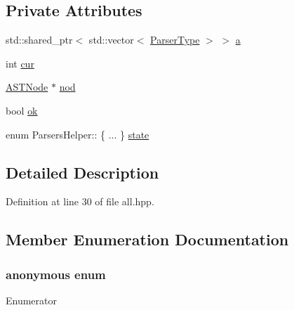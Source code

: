 \subsection*{Private Attributes}
\begin{DoxyCompactItemize}
\item 
std\+::shared\+\_\+ptr$<$ std\+::vector$<$ \hyperlink{parsers_2all_8hpp_abe36ed7c3b8a2eebe6d943c84fe72b9c}{Parser\+Type} $>$ $>$ \hyperlink{class_parsers_helper_a1c30abdf7ce5ad7d5e67237f88f18223}{a}
\item 
int \hyperlink{class_parsers_helper_a51c199f259d9aadab7d02681c9e57c49}{cur}
\item 
\hyperlink{struct_a_s_t_node}{A\+S\+T\+Node} $\ast$ \hyperlink{class_parsers_helper_a241ca292b5a231634a4486120c1d4b9f}{nod}
\item 
bool \hyperlink{class_parsers_helper_a88e598a10d698b0962efa12ee6121436}{ok}
\item 
enum Parsers\+Helper\+:: \{ ... \}  \hyperlink{class_parsers_helper_a268b5522cce719a0c28d3e48d9b5cc04}{state}
\end{DoxyCompactItemize}


\subsection{Detailed Description}


Definition at line 30 of file all.\+hpp.



\subsection{Member Enumeration Documentation}
\hypertarget{class_parsers_helper_ac5239b5c4a61b2f239f668b738f613be}{}\subsubsection[{anonymous enum}]{\setlength{\rightskip}{0pt plus 5cm}anonymous enum\hspace{0.3cm}{\ttfamily [private]}}\label{class_parsers_helper_ac5239b5c4a61b2f239f668b738f613be}
\begin{Desc}
\item[Enumerator]\par
\begin{description}
\item[{\em 
\hypertarget{class_parsers_helper_ac5239b5c4a61b2f239f668b738f613bea11c61fd76dd1cc499d0a82c995b29009}{}Construct\label{class_parsers_helper_ac5239b5c4a61b2f239f668b738f613bea11c61fd76dd1cc499d0a82c995b29009}
}]\item[{\em 
\hypertarget{class_parsers_helper_ac5239b5c4a61b2f239f668b738f613beae4bcb2b09e1ae01be6741b0d5dff5252}{}Parse\label{class_parsers_helper_ac5239b5c4a61b2f239f668b738f613beae4bcb2b09e1ae01be6741b0d5dff5252}
}]\end{description}
\end{Desc}


